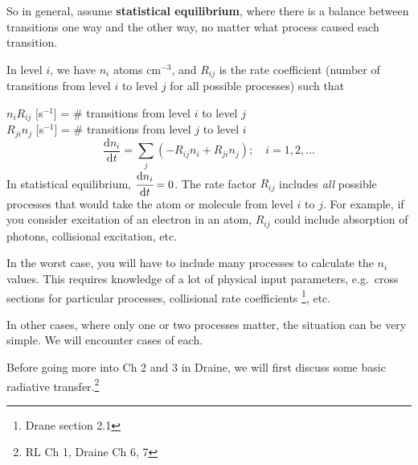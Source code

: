 \documentclass[12pt]{article}
\newcommand{\mar}[1]{\hspace{0pt}\marginpar{-\textcolor{black}{#1}-}}
\begin{document}
So in general, assume \textbf{statistical equilibrium}, where there is
a balance between transitions one way and the other way, no matter
what process caused each transition.

In level $i$, we have $n_{i}$ atoms cm$^{-3}$, and
$R_{ij}$ is the rate coefficient (number of transitions from level $i$
to level $j$ for all possible processes) such that

$n_{i}R_{ij}$ [s$^{-1}$] = \# transitions from level $i$ to level $j$\\
$R_{ji}n_{j}$ [s$^{-1}$] = \# transitions from level $j$ to level $i$\\

\[
    \frac{\mathrm{d}n_{i}}{\mathrm{d}t} =
    \sum_{j}\left(-R_{ij}n_{i} + R_{ji}n_{j}\right);\quad i=1,2,\ldots
    \]
\mar{23}In statistical equilibrium,
$\cfrac{\mathrm{d}n_{i}}{\mathrm{d}t} = 0$. The rate factor $R_{ij}$
includes \emph{all} possible processes that would take the atom or
molecule from level $i$ to $j$.
For example, if you consider excitation of an electron in an atom,
$R_{ij}$ could include absorption of photons, collisional excitation, etc.

In the worst case, you will have to include many processes to calculate the
$n_{i}$ values. This requires knowledge of a lot of physical input
parameters, e.g.\ cross sections for particular processes, collisional rate
coefficients \footnote{Drane section 2.1}, etc.

In other cases, where only one or two processes matter, the situation
can be very simple. We will encounter cases of each.

Before going more into Ch 2 and 3 in Draine, we will first discuss
some basic radiative transfer.\footnote{RL Ch 1, Draine Ch 6, 7}

\newpage
\end{document}
